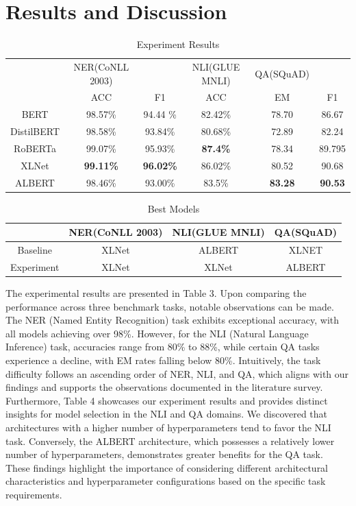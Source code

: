 \documentclass{article}
\begin{document}
\section{Results and Discussion}
\begin{table}[h]
    \centering
    \begin{tabular}{c|c|c|c|c|c}
        & NER(CoNLL 2003) & & NLI(GLUE MNLI) & QA(SQuAD) & \\
        & ACC & F1 & ACC & EM & F1 \\
        \hline
        BERT & 98.57\% & 94.44 \% & 82.42\%  & 78.70 & 86.67  \\
        DistilBERT & 98.58\% & 93.84\% & 80.68\%  & 72.89 & 82.24\\
        RoBERTa & 99.07\% & 95.93\% & \textbf{87.4\%} & 78.34 & 89.795 \\
        XLNet & \textbf{99.11\%} & \textbf{96.02\%} & 86.02\%  & 80.52 & 90.68 \\
        ALBERT & 98.46\% & 93.00\% & 83.5\% & \textbf{83.28} & \textbf{90.53} 
    \end{tabular}
    \caption{Experiment Results}
    \label{tab:my_label}
\end{table}
\begin{table}[h]
    \centering
    \begin{tabular}{c|c|c|c}
        & NER(CoNLL 2003) & NLI(GLUE MNLI) & QA(SQuAD) \\
        \hline
        Baseline & XLNet & ALBERT & XLNET  \\
        \hline
        Experiment & XLNet & XLNet & ALBERT  \\
    \end{tabular}
    \caption{Best Models}
    \label{tab:my_label}
\end{table}
The experimental results are presented in Table 3. Upon comparing the performance across three benchmark tasks, notable observations can be made. The NER (Named Entity Recognition) task exhibits exceptional accuracy, with all models achieving over 98\%. However, for the NLI (Natural Language Inference) task, accuracies range from 80\% to 88\%, while certain QA tasks experience a decline, with EM rates falling below 80\%. Intuitively, the task difficulty follows an ascending order of NER, NLI, and QA, which aligns with our findings and supports the observations documented in the literature survey.
Furthermore, Table 4 showcases our experiment results and provides distinct insights for model selection in the NLI and QA domains. We discovered that architectures with a higher number of hyperparameters tend to favor the NLI task. Conversely, the ALBERT architecture, which possesses a relatively lower number of hyperparameters, demonstrates greater benefits for the QA task. These findings highlight the importance of considering different architectural characteristics and hyperparameter configurations based on the specific task requirements.
\end{document}
